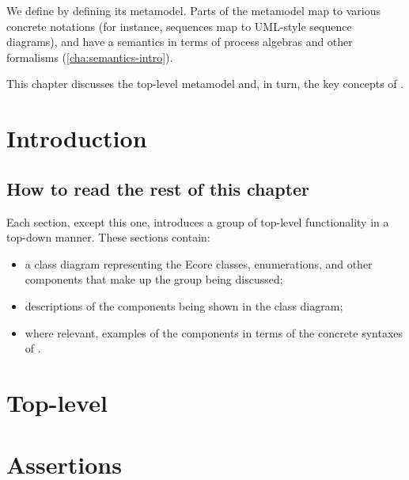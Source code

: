 

We define \langname{} by defining its
metamodel.  Parts of the metamodel map to various concrete notations (for
instance, sequences map to UML-style sequence diagrams), and have a semantics
in terms of process algebras and other formalisms (\cref{cha:semantics-intro}).

This chapter discusses the top-level metamodel and, in turn, the key concepts
of \langname.

\section{Introduction}\label{ssec:core-metamodel-intro}
\subsection{How to read the rest of this chapter}\label{ssec:core-metamodel-intro-readme}

Each section, except this one,
introduces a group of top-level \langname{}
functionality in a top-down manner.  These sections contain:

\begin{itemize}
\item
	a class diagram representing the Ecore classes, enumerations, and other
	components that make up the group being discussed;
\item
	descriptions of the components being shown in the class diagram;
\item
	where relevant, examples of the components in terms of the concrete
	syntaxes of \langname.
\end{itemize}

\section{Top-level}\label{sec:core-metamodel-top}


\section{Assertions}\label{sec:core-metamodel-assertions}


